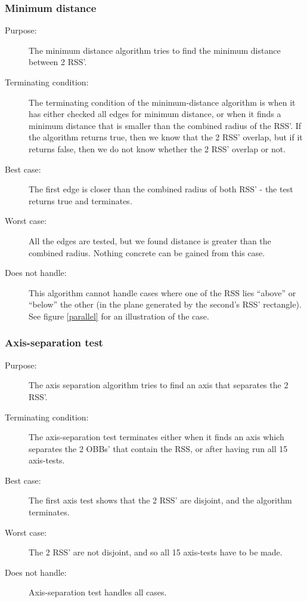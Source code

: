 \subsubsection{Minimum distance}
\begin{description}
\item[Purpose:] The minimum distance algorithm tries to find the minimum distance between 2 RSS'.
\item[Terminating condition:]The terminating condition of the minimum-distance algorithm is when it has either checked all edges for minimum distance, or when it finds a minimum distance that is smaller than the combined radius of the RSS'. If the algorithm returns true, then we know that the 2 RSS' overlap, but if it returns false, then we do not know whether the 2 RSS' overlap or not.
\item[Best case:] The first edge is closer than the combined radius of both RSS' - the test returns true and terminates.
\item[Worst case:] All the edges are tested, but we found distance is greater than the combined radius. Nothing concrete can be gained from this case.
\item[Does not handle:] This algorithm cannot handle cases where one of the RSS lies ``above'' or ``below'' the other (in the plane generated by the second's RSS' rectangle). See figure \ref{parallel} for an illustration of the case.
\end{description}

\subsubsection{Axis-separation test}
\begin{description}
\item[Purpose:] The axis separation algorithm tries to find an axis that separates the 2 RSS'. 
\item[Terminating condition:] The axis-separation test terminates either when it finds an axis which separates the 2 OBBs' that contain the RSS, or after having run all 15 axis-tests.
\item[Best case:] The first axis test shows that the 2 RSS' are disjoint, and the algorithm terminates. 
\item[Worst case:] The 2 RSS' are not disjoint, and so all 15 axis-tests have to be made.
\item[Does not handle:] Axis-separation test handles all cases.
\end{description}

